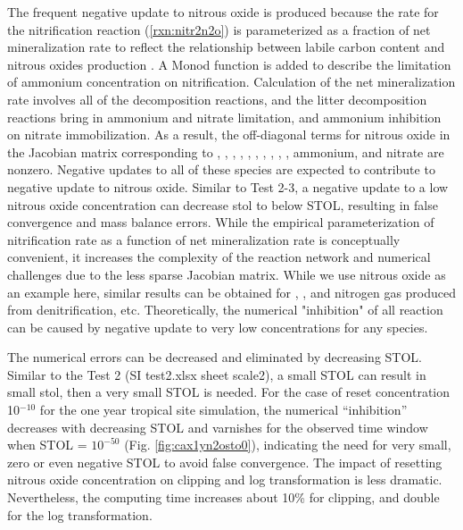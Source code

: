 \documentclass[gmd, manuscript]{copernicus}
\begin{document}
The frequent negative update to nitrous oxide is produced because the rate for
the nitrification reaction (\ref{rxn:nitr2n2o}) is parameterized as a fraction
of net mineralization rate to reflect the relationship between labile carbon
content and nitrous oxides production \citep{Parton1996}. A Monod function is
added to describe the limitation of ammonium concentration on nitrification.
Calculation of the net mineralization rate involves all of the decomposition
reactions, and the litter decomposition reactions bring in ammonium and nitrate
limitation, and ammonium inhibition on nitrate immobilization. As a result, the
off-diagonal terms for nitrous oxide in the Jacobian matrix corresponding to
, , , , ,
, , , , , ammonium, and
nitrate are nonzero. Negative updates to all of these species are expected to
contribute to negative update to nitrous oxide. Similar to Test 2-3, a negative
update to a low nitrous oxide concentration can decrease stol to below STOL,
resulting in false convergence and mass balance errors. While the empirical
parameterization of nitrification rate as a function of net mineralization rate
is conceptually convenient, it increases the complexity of the reaction network
and numerical challenges due to the less sparse Jacobian matrix. While we use
nitrous oxide as an example here, similar results can be obtained for
, , and nitrogen gas produced from denitrification,
etc. Theoretically, the numerical "inhibition" of all reaction can be caused by
negative update to very low concentrations for any species. 

The numerical errors can be decreased and eliminated by decreasing STOL.
Similar to the Test 2 (SI test2.xlsx sheet scale2), a small STOL can result in
small stol, then a very small STOL is needed. For the case of reset
concentration 10$^{-10}$ for the one year tropical site simulation, the
numerical ``inhibition'' decreases with decreasing STOL and varnishes for the
observed time window when STOL = $10^{-50}$ (Fig. \ref{fig:cax1yn2osto0}),
indicating the need for very small, zero or even negative STOL to avoid false
convergence. The impact of resetting nitrous oxide concentration on clipping
and log transformation is less dramatic. Nevertheless, the computing time
increases about 10\% for clipping, and double for the log transformation.  

\end{document}
